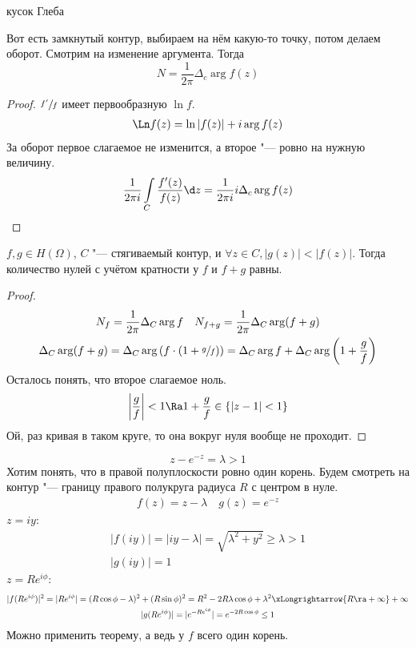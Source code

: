 \TODO кусок Глеба

Вот есть замкнутый контур, выбираем на нём какую-то точку, потом делаем оборот.
Смотрим на изменение аргумента.
Тогда
\[ N = \frac1{2\pi} \Delta_c \arg f(z) \]

\begin{proof}
	$\sfrac{f'}f$ имеет первообразную $\ln f$.
	\begin{gather*}
		\Ln f(z) = \ln |f(z)| + i \arg f(z)
	\end{gather*}
	За оборот первое слагаемое не изменится, а второе "--- ровно на нужную величину.
	\begin{gather*}
		\frac1{2\pi i} \int\limits_C \frac{f'(z)}{f(z)} \d z = \frac1{2\pi i} i \Delta_c \arg f(z)
	\end{gather*}
\end{proof}

\begin{theorem}[Руме]
	$f, g \in H(\Omega)$, $C$ "--- стягиваемый контур, и $\forall z \in C, |g(z)| < |f(z)|$.
	Тогда количество нулей с учётом кратности у $f$ и $f + g$ равны.
\end{theorem}
\begin{proof}
	\begin{gather*}
		N_f = \frac1{2\pi} \Delta_C \arg f \quad N_{f+g} = \frac1{2\pi} \Delta_C \arg(f+g) \\
		\Delta_C \arg(f+g)
		= \Delta_C \arg \left(f\cdot\left(1 + \sfrac gf\right)\right)
		= \Delta_C \arg f + \Delta_C \arg \left(1 + \frac gf\right)
	\end{gather*}
	Осталось понять, что второе слагаемое ноль.
	\begin{gather*}
		\left|\frac gf\right| < 1 \Ra 1 + \frac gf \in \{|z - 1| < 1\}
	\end{gather*}
	Ой, раз кривая в таком круге, то она вокруг нуля вообще не проходит.
\end{proof}

\begin{exmp}
	\[ z - e^{-z} = \lambda > 1 \]
	Хотим понять, что в правой полуплоскости ровно один корень.
	Будем смотреть на контур "--- границу правого полукруга радиуса $R$ с центром в нуле.
	\begin{gather*}
		f(z) = z - \lambda \quad g(z) = e^{-z}
	\end{gather*}
	$z = iy$:
	\begin{gather*}
		|f(iy)| = |iy - \lambda| = \sqrt{\lambda^2+y^2} \ge \lambda > 1 \\
		|g(iy)| = 1
	\end{gather*}
	$z = Re^{i\phi}$:
	\begin{gather*}
		|f(Re^{i\phi})|^2
		= |Re^{i\phi}|
		= (R\cos \phi - \lambda)^2 + (R\sin \phi)^2
		= R^2 - 2R\lambda \cos \phi + \lambda^2 \xLongrightarrow{R \ra +\infty} +\infty \\
		|g(Re^{i\phi})|
		= |e^{-Re^{i\phi}}|
		= e^{-2R\cos \phi} \le 1
	\end{gather*}
	Можно применить теорему, а ведь у $f$ всего один корень.
\end{exmp}

